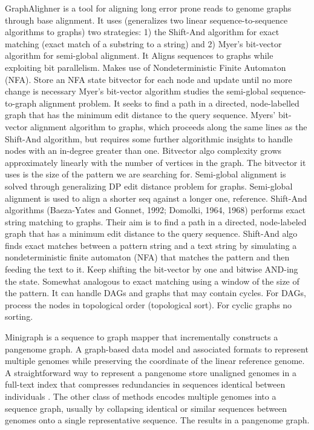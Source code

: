 \documentclass[10pt, a4paper]{article}
\begin{document}
GraphAlighner \cite{rautiainenBitparallelSequencetographAlignment2019} is a tool
for aligning long error prone reads to genome graphs through base alignment.
It uses (generalizes two linear sequence-to-sequence algorithms to graphs) two
strategies: 1) the Shift-And algorithm for exact matching (exact match of a
substring to a string) and 2) Myer’s bit-vector algorithm for semi-global
alignment. It Aligns sequences to graphs while exploiting bit parallelism.
Makes use of Nondeterministic Finite Automaton (NFA).
Store an NFA state bitvector for each node and update until no more change is
necessary Myer’s bit-vector algorithm studies the semi-global sequence-to-graph
alignment problem.
It seeks to find a path in a directed, node-labelled graph that has the
minimum edit distance to the query sequence. Myers’ bit-vector alignment
algorithm \cite{myersFastBitvectorAlgorithm1999} to graphs, which proceeds along
the same lines as the Shift-And algorithm, but requires some further algorithmic
insights to handle nodes with an in-degree greater than one.
Bitvector algo complexity grows approximately linearly with the number of
vertices in the graph.
The bitvector it uses is the size of the pattern we are searching for.
Semi-global alignment is solved through generalizing DP edit distance problem
for graphs.
Semi-global alignment is used to align a shorter seq against a longer one,
reference.
Shift-And algorithms (Baeza-Yates and Gonnet, 1992; Domolki, 1964, 1968)
performs exact string matching to graphs.
Their aim is to find a path in a directed, node-labeled graph that has a minimum
edit distance \cite{levenshteinBinaryCodesCapable1966a} to the query sequence.
Shift-And algo finds exact matches between a pattern string and a text string by
simulating a nondeterministic finite automaton (NFA) that matches the pattern
and then feeding the text to it.
Keep shifting the bit-vector by one and bitwise AND-ing the state.
Somewhat analogous to exact matching using a window of the size of the pattern.
It can handle DAGs and  graphs that may contain cycles. For DAGs, process the
nodes in topological order (topological sort). For cyclic graphs no sorting.

Minigraph \cite{liDesignConstructionReference2020} is a sequence to graph mapper
that incrementally constructs a pangenome graph.
A graph-based data model and associated formats to represent multiple genomes
while preserving the coordinate of the linear reference genome.
A straightforward way to represent a pangenome store unaligned genomes in a
full-text index that compresses redundancies in sequences identical between
individuals
\cite{makinenStorageRetrievalHighly2010,liuDeBWTParallelConstruction2016,boucherPrefixfreeParsingBuilding2019}.
The other class of methods encodes multiple genomes into a sequence graph,
usually by collapsing identical or similar sequences between genomes onto a
single representative sequence. The results in a pangenome graph.
\end{document}
